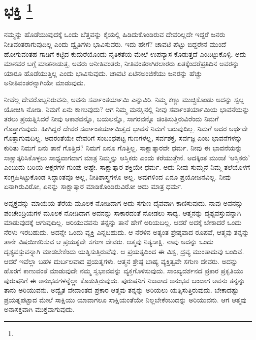 
\chapter[ಭಕ್ತಿ ]{ಭಕ್ತಿ \protect\footnote{}}

ನಮ್ಮನ್ನು ಹೊಡೆಯುವುದಕ್ಕೆ ಒಂದು ಬೆತ್ತವನ್ನು ಕೈಯಲ್ಲಿ ಹಿಡಿದುಕೊಂಡಿರುವ ದೇವ\-ರಿಲ್ಲದೇ ಇದ್ದರೆ ಜನರು ನೀತಿವಂತರಾಗುವುದಿಲ್ಲ ಎಂದು ದ್ವೈತಿಗಳು ಭಾವಿಸುವರು. ಇದು ಹೇಗೆ? ಚಾವಟಿ ಪೆಟ್ಟು ಬಿದ್ದರೇನೆ ಮುಂದೆ ಹೋಗುವಂತಹ ಗಾಡಿಗೆ ಕಟ್ಟಿದ ಕುದುರೆಯೊಂದು ನೈತಿಕತೆಯ ಮೇಲೆ ಉಪನ್ಯಾಸ ಕೊಡುತ್ತದೆ ಎಂದಿಟ್ಟುಕೊಳ್ಳಿ. ಅದು ಮಾನವರ ಬಗ್ಗೆ ಮಾತನಾಡುತ್ತ, ಅವರು ಅನೀತಿವಂತರು, ನೀತಿವಂತರಾಗಿರಲಾರರು ಏತಕ್ಕೆಂದರೆ\break ಪ್ರತಿದಿನ ಅವರನ್ನು ಯಾರೂ ಹೊಡೆಯುತ್ತಿಲ್ಲ ಎಂದು ಭಾವಿಸುವುದು. ಚಾವಟಿ ಏಟಿನ\break ಅಂಜಿಕೆಯು ಜನರನ್ನು ಹೆಚ್ಚು ಅನೀತಿವಂತರನ್ನಾಗಿಯೇ ಮಾಡುವುದು.

ನೀವೆಲ್ಲ ದೇವರೊಬ್ಬನಿರುವನು, ಅವನು ಸರ್ವಾಂತರ್ಯಾಮಿ ಎನ್ನುವಿರಿ. ನಿಮ್ಮ ಕಣ್ಣು ಮುಚ್ಚಿಕೊಂಡು ಅದನ್ನು ಸ್ವಲ್ಪ ಯೋಚಿಸಿ ನೋಡಿ. ನಿಮಗೆ ಏನು ಕಾಣುವುದು? ಆಗ ನಿಮ್ಮ ಮನಸ್ಸಿನಲ್ಲಿ ನೀವು ಸರ್ವಾಂತರ್ಯಾಮಿಯ ಭಾವನೆಯನ್ನು ತರಲು ಪ್ರಯತ್ನಿಸಿದರೆ ನೀವು ಆಕಾಶವನ್ನೊ, ಬಯಲನ್ನೊ, ಸಾಗರವನ್ನೊ ಚಿಂತಿಸುತ್ತಿರುವಿರೆಂದು ನಿಮಗೆ ಗೊತ್ತಾಗುವುದು. ಹೀಗಿದ್ದರೆ ದೇವರ ಸರ್ವಾಂತರ್ಯಾಮಿತ್ವದ ಭಾವನೆ ನಿಮಗೆ ಬರುವುದಿಲ್ಲ. ನಿಮಗೆ ಅದರ ಅರ್ಥವೇ ಗೊತ್ತಾಗುವುದಿಲ್ಲ. ಅದರಂತೆಯೇ ದೇವರಿಗೆ ಸಂಬಂಧಪಟ್ಟ ಗುಣಗಳೆಲ್ಲ, ಸರ್ವಶಕ್ತ, ಸರ್ವಜ್ಞ ಎಂಬ ಭಾವನೆಗಳನ್ನು ಕುರಿತು ನಿಮಗೆ ಏನು ತಾನೆ ಗೊತ್ತಿದೆ? ನಿಮಗೆ ಏನೂ ಗೊತ್ತಿಲ್ಲ. ಸಾಕ್ಷಾತ್ಕಾರವೇ ಧರ್ಮ. ನೀವು ಈ ಭಾವನೆಯನ್ನು ಸಾಕ್ಷಾತ್ಕರಿಸಿಕೊಳ್ಳಲು ಸಾಧ್ಯವಾಗದಾಗ ಮಾತ್ರ ನಿಮ್ಮನ್ನು ಆಸ್ತಿಕರು ಎಂದು ಕರೆಯುತ್ತೇನೆ. ಅದಕ್ಕಿಂತ ಮುಂಚೆ ‘ಆಸ್ತಿಕರು’ ಎಂಬುದು ಬರಿಯ ಅಕ್ಷರಗಳ ಗುಂಪು ಅಷ್ಟೇ. ಸಾಕ್ಷಾತ್ಕಾರ ಶಕ್ತಿಯೇ ಧರ್ಮ. ಅದು ನೀವು ಸುಮ್ಮನೆ ನಿಮ್ಮ ತಲೆಯೊಳಗೆ ಸಂಗ್ರಹಿಸಿಟ್ಟುಕೊಂಡ ಸಿದ್ಧಾಂತವೂ ಅಲ್ಲ, ನೀತಿಶಾಸ್ತ್ರಗಳೂ ಅಲ್ಲ. ಅವುಗಳಿಂದ ಏನೂ ಪ್ರಯೋಜನವಿಲ್ಲ. ನೀವು ಏನಾಗಿರುವಿರೋ, ಏನನ್ನು ಸಾಕ್ಷಾತ್ಕಾರ ಮಾಡಿಕೊಂಡಿರುವಿರೋ ಅದು ಮಾತ್ರ ಧರ್ಮ.

ಅವ್ಯಕ್ತವನ್ನು ಮಾಯೆಯ ತೆರೆಯ ಮೂಲಕ ನೋಡಿದಾಗ ಅದು ಸಗುಣ ದೈವವಾಗಿ ಕಾಣಿಸುವುದು. ನಾವು ಅವನನ್ನು ಪಂಚೇಂದ್ರಿಯಗಳ ಮೂಲಕ ನೋಡಿದಾಗ ಅವನನ್ನು ಸಾಕಾರದಂತೆ ನೋಡಲು ಸಾಧ್ಯ. ಆತ್ಮನನ್ನು ದೃಶ್ಯವಸ್ತುವನ್ನಾಗಿ ಮಾಡುವುದಕ್ಕೆ ಆಗುವುದಿಲ್ಲ. ಅರಿಯುವವನು ತನ್ನನ್ನು ತಾನೆ ಹೇಗೆ ಅರಿಯಬಲ್ಲ. ಆದರೆ ಅದಕ್ಕೆ ಬೇಕಾದರೆ ಒಂದು ನೆರಳು ಇರಬಹುದು. ಅದನ್ನೇ ಒಂದು ವ್ಯಕ್ತಿ ಎನ್ನಬಹುದು. ಆ ನೆರಳಿನ ಅತ್ಯಂತ ಶ್ರೇಷ್ಠವಾದ ರೂಪವೆ, ಆತ್ಮವು ತನ್ನನ್ನು ತಾನೇ ವಿಷಯೀಕರಿಸುವ ಆ ಪ್ರಯತ್ನವೇ ಸಗುಣ ದೇವರು. ಆತ್ಮವು ನಿತ್ಯಸಾಕ್ಷಿ. ನಾವು ಅದನ್ನು ಒಂದು ದೃಶ್ಯವಸ್ತುವನ್ನಾಗಿ ಮಾಡಬೇಕೆಂದು ಯತ್ನಿಸುತ್ತಿರುವೆವು. ಆ ಪ್ರಯತ್ನದಿಂದ ಈ ವಿಶ್ವ, ದ್ರವ್ಯ ಮುಂತಾದುವು ಬಂದಿವೆ. ಆದರೆ ಇವೆಲ್ಲಾ ಬಹಳ ದುರ್ಬಲವಾದ ಪ್ರಯತ್ನಗಳು. ಆತ್ಮನ ಶ್ರೇಷ್ಠ ಬಾಹ್ಯ ವ್ಯಕ್ತಿತ್ವವೇ ಸಗುಣ ದೇವರು. ಅದನ್ನು ಹೊರಗೆ ಕಾಣುವಂತೆ ಮಾಡುವುದೇ ನಮ್ಮ ಸ್ವಭಾವವನ್ನು ವ್ಯಕ್ತಗೊಳಿಸುವುದು. ಸಾಂಖ್ಯದರ್ಶನದ ಪ್ರಕಾರ ಪ್ರಕೃತಿಯು ಪುರುಷನಿಗೆ ಈ ಅನುಭವಗಳನ್ನೆಲ್ಲಾ ಕೊಡುತ್ತಿರುವುದು. ಪುರುಷನಿಗೆ ನಿಜವಾದ ಅನುಭವ ಬಂದಾಗ ಅವನು ತನ್ನನ್ನು ತಾನು ಅರಿಯುವನು. ಅದ್ವೈತ ವೇದಾಂತದ ಪ್ರಕಾರ ಆತ್ಮವು ತನ್ನನ್ನು ಅರಿಯಲು ಯತ್ನಿಸುತ್ತಿರುವುದು. ಬೇಕಾದಷ್ಟು ಪ್ರಯತ್ನಪಟ್ಟಾದ ಮೇಲೆ ಸಾಕ್ಷಿಯು ಯಾವಾಗಲೂ ಸಾಕ್ಷಿಯಂತೆಯೇ ನಿಲ್ಲಬೇಕೆಂಬುದನ್ನು ಅರಿಯುವನು. ಆಗ ಆತ್ಮವು ಅನಾಸಕ್ತವಾಗಿ ಮುಕ್ತವಾಗುವುದು.

